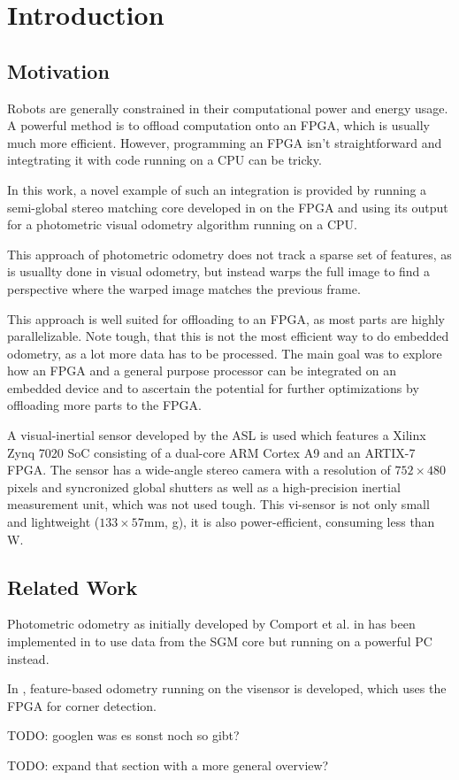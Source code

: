\chapter{Introduction}
\label{sec:introduction}

\section{Motivation}
\label{sec:motivation}

Robots are generally constrained in their computational power and energy usage.
A powerful method is to offload computation onto an FPGA, which is usually
much more efficient.  However, programming an FPGA isn't straightforward and
integtrating it with code running on a CPU can be tricky.

In this work, a novel example of such an integration is provided by running a
semi-global stereo matching \cite{hirschmuller2005sgm} core developed in
\cite{honegger2014sgmcore} on the FPGA and using its output for a photometric
visual odometry algorithm running on a CPU.

This approach of photometric odometry does not track a sparse set of features,
as is usuallty done in visual odometry, but instead warps the full image to
find a perspective where the warped image matches the previous frame.

This approach is well suited for offloading to an FPGA, as most parts are
highly parallelizable. Note tough, that this is not the most efficient way to do embedded odometry,
as a lot more data has to be processed. The main goal was to explore how an
FPGA and a general purpose processor can be integrated on an embedded device
and to ascertain the potential for further optimizations by offloading more
parts to the FPGA.

A visual-inertial sensor developed by the ASL \cite{nikolic2014synchronized} is
used which features a Xilinx Zynq 7020 SoC consisting of a dual-core ARM Cortex
A9 and an ARTIX-7 FPGA. The sensor has a wide-angle stereo camera with a
resolution of $752 \times 480$ pixels and syncronized global shutters as well
as a high-precision inertial measurement unit, which was not used tough. This
vi-sensor is not only small and lightweight ($133 \times 57$mm, \unit[130]{g}),
it is also power-efficient, consuming less than \unit[10]{W}.



\section{Related Work}
\label{sec:related_work}

Photometric odometry as initially developed by Comport et al. in
\cite{comport2007odometry} has been implemented in \cite{omaridenseodometry} to
use data from the SGM core but running on a powerful PC instead.

In \cite{marcin2014odometry}, feature-based odometry running on the visensor is
developed, which uses the FPGA for corner detection.



TODO: googlen was es sonst noch so gibt?

TODO: expand that section with a more general overview?
